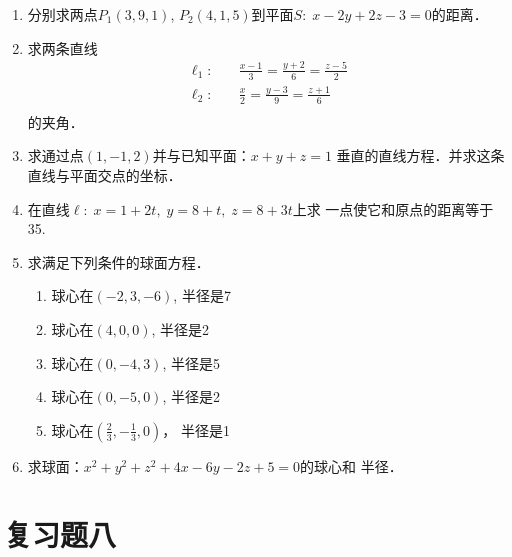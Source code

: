 \begin{enumerate}
\item 分别求两点$P_1(3,9,1)$, $P_2(4,1,5)$到平面$S:\;
x-2y+2z-3=0$的距离．
\item 求两条直线
\[\begin{split}
    \ell_1:&\quad \frac{x-1}{3}=\frac{y+2}{6}=\frac{z-5}{2}\\
    \ell_2:&\quad \frac{x}{2}=\frac{y-3}{9}=\frac{z+1}{6}\\
\end{split}\]
的夹角．
\item 求通过点$(1,-1,2)$并与已知平面：$x+y+z=1$
垂直的直线方程．并求这条直线与平面交点的坐标．
\item 在直线$\ell:\; x=1+2t,\; y=8+t,\; z=8+3t$上求
一点使它和原点的距离等于35.
\item 求满足下列条件的球面方程．
\begin{multicols}{2}
    \begin{enumerate}
    \item 球心在$(-2,3,-6)$, 半径是7
    \item 球心在$(4,0,0)$, 半径是2
    \item 球心在$(0,-4,3)$, 半径是5
    \item 球心在$(0,-5,0)$, 半径是2
    \item 球心在$\left(\frac{2}{3},-\frac{1}{3},0\right)$，
半径是1
\end{enumerate}
\end{multicols}

\item 求球面：$x^2+y^2+z^2+4x-6y-2z+5=0$的球心和
半径．
\end{enumerate}

\section*{复习题八}

